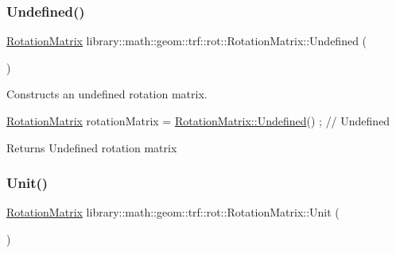 \subsubsection{\texorpdfstring{Undefined()}{Undefined()}}
{\footnotesize\ttfamily \hyperlink{classlibrary_1_1math_1_1geom_1_1trf_1_1rot_1_1_rotation_matrix}{Rotation\+Matrix} library\+::math\+::geom\+::trf\+::rot\+::\+Rotation\+Matrix\+::\+Undefined (\begin{DoxyParamCaption}{ }\end{DoxyParamCaption})\hspace{0.3cm}{\ttfamily [static]}}



Constructs an undefined rotation matrix. 


\begin{DoxyCode}
\hyperlink{classlibrary_1_1math_1_1geom_1_1trf_1_1rot_1_1_rotation_matrix_a667d2c05aa5b0cc88775938d11164cdc}{RotationMatrix} rotationMatrix = \hyperlink{classlibrary_1_1math_1_1geom_1_1trf_1_1rot_1_1_rotation_matrix_a0d1a95670bf9a5ae6bb2ac1bdee0294f}{RotationMatrix::Undefined}() ; \textcolor{comment}{//
       Undefined}
\end{DoxyCode}


\begin{DoxyReturn}{Returns}
Undefined rotation matrix 
\end{DoxyReturn}
\mbox{\label{classlibrary_1_1math_1_1geom_1_1trf_1_1rot_1_1_rotation_matrix_aac59b7dafc34767d24d0934f4b86bef0}} 
\subsubsection{\texorpdfstring{Unit()}{Unit()}}
{\footnotesize\ttfamily \hyperlink{classlibrary_1_1math_1_1geom_1_1trf_1_1rot_1_1_rotation_matrix}{Rotation\+Matrix} library\+::math\+::geom\+::trf\+::rot\+::\+Rotation\+Matrix\+::\+Unit (\begin{DoxyParamCaption}{ }\end{DoxyParamCaption})\hspace{0.3cm}{\ttfamily [static]}}



